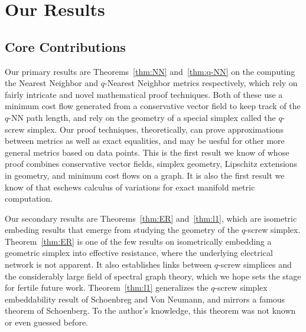 \section{Our Results}
\subsection{Core Contributions}
Our primary results are Theorems~\ref{thm:NN} and~\ref{thm:q-NN} on the
computing the Nearest Neighbor and $q$-Nearest Neighbor metrics
respectively, which rely
on fairly intricate and novel mathematical proof techniques. Both of these
use a minimum cost flow generated from a conservative vector field to keep
track of the $q$-NN path length, and rely on the geometry of a special
simplex called the
$q$-screw simplex. Our proof techniques, theoretically, can prove
approximations between metrics as well as exact equalities, and may be
uesful for other more general metrics based on data points. This is the
first result we know of whose proof combines
conservative vector fields, simplex geometry, Lipschitz extensions in
geometry, and minimum cost flows on a graph. It is also the first result we
know of that eschews calculus of variations for exact manifold metric
computation.

Our secondary results are Theorems~\ref{thm:ER} and~\ref{thm:l1}, which are
isometric embeding results that emerge from studying the geometry of the
$q$-screw simplex. 
Theorem~\ref{thm:ER} is one of the few results on isometrically embedding a
geometric simplex into effective resistance, where the underlying
electrical network is not apparent. It also establishes links between
$q$-screw simplices and the considerably large field of spectral graph theory,
which we hope sets the stage for fertile future work.
Theorem~\ref{thm:l1} generalizes the $q$-screw simplex embeddability result
of Schoenbreg and Von Neumann, and mirrors a famous theorem of Schoenberg.
To the author's knowledge, this theorem was not known or even guessed
before.

